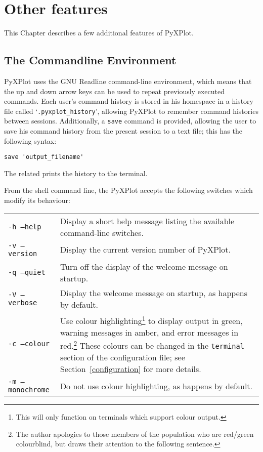 \chapter{Other features}

This Chapter describes a few additional features of PyXPlot.

\section{The Commandline Environment}

PyXPlot uses the GNU Readline command-line environment, which means that the up
and down arrow keys can be used to repeat previously executed commands. Each
user's command history is stored in his homespace in a history file called
`\texttt{.pyxplot\_history}', allowing PyXPlot to remember command histories
between sessions. Additionally, a \texttt{save} command is provided, allowing
the user to save his command history from the present session to a text file;
this has the following syntax:

\begin{verbatim}
save 'output_filename'
\end{verbatim}

The related  prints the history
to the terminal.

From the shell command line, the PyXPlot accepts the following switches which
modify its behaviour:

\begin{longtable}{p{3.5cm}p{8.5cm}}
\texttt{-h --help} & Display a short help message listing the available command-line switches.\\
\texttt{-v --version} & Display the current version number of PyXPlot.\\
\texttt{-q --quiet} & Turn off the display of the welcome message on startup. \\
\texttt{-V --verbose} & Display the welcome message on startup, as happens by default. \\
\texttt{-c --colour} & Use colour highlighting\footnote{This will only function on terminals which support colour output.} to display output in green, warning messages in amber, and error messages in red.\footnote{The author apologies to those members of the population who are red/green colourblind, but draws their attention to the following sentence.} These colours can be changed in the \texttt{terminal} section of the configuration file; see Section~\ref{configuration} for more details. \\
\texttt{-m --monochrome} & Do not use colour highlighting, as happens by default. \\
\end{longtable}

